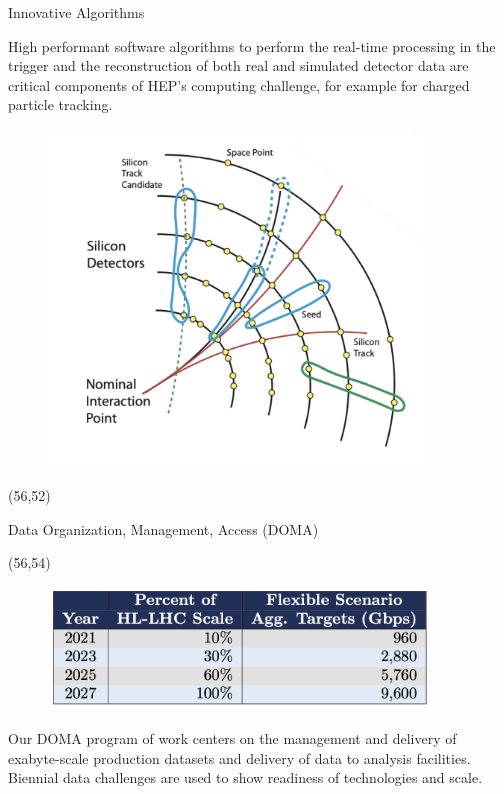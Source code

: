 \documentclass[final]{beamer}
\begin{document}
\begin{frame}{}
\begin{textblock}{25.0}
\begin{block}{Innovative Algorithms}
\begin{textblock}{25.0}
\begin{figure}[tbph]
\end{figure}
High performant software algorithms to perform the real-time processing in the trigger and the reconstruction of both real and simulated detector data are critical components of HEP’s computing challenge, for example for charged particle tracking. 
\begin{figure}[tbph]
\centering
\includegraphics[width=0.90\textwidth]{images/trackreco-graphic.png}
\end{figure}
\end{textblock}
\end{block}
\end{textblock}
\begin{textblock}{25.0}(56,52)
\begin{block}{Data Organization, Management, Access (DOMA)}
\begin{textblock}{25.0}(56,54)
\begin{figure}[tbph]
\centering
\includegraphics[width=0.90\textwidth]{images/doma-scale-challenges.png}
\end{figure}
Our DOMA program of work centers on the management and delivery of exabyte-scale production datasets and delivery of data to analysis facilities. Biennial data challenges are used to show readiness of technologies and scale.

\end{textblock}
\end{block}
\end{textblock}
\end{frame}
\end{document}
